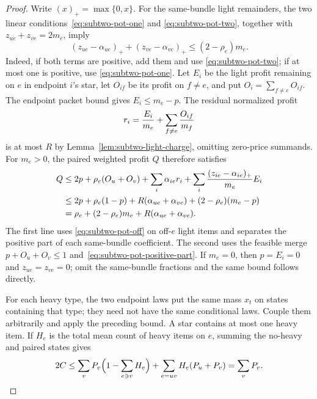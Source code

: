 \documentclass[11pt]{article}
\theoremstyle{definition}\newtheorem{algorithm}{Algorithm}[section]
\numberwithin{equation}{section}
\theoremstyle{remark}\newtheorem*{remark}{Remark}
\begin{document}
\begin{proof}
Write $(x)_+=\max\{0,x\}$. For the same-bundle light remainders, the two linear
conditions~\eqref{eq:subtwo-pot-one} and
\eqref{eq:subtwo-pot-two}, together with
$z_{ue}+z_{ve}=2m_e$, imply
\begin{equation}\label{eq:subtwo-pot-positive-part}
 (z_{ue}-\alpha_{ue})_+
 +(z_{ve}-\alpha_{ve})_+
                  \le(2-\rho_e)m_e.
\end{equation}
Indeed, if both terms are positive, add them and use
\eqref{eq:subtwo-pot-two}; if at most one is positive, use
\eqref{eq:subtwo-pot-one}. Let $E_i$ be the light profit remaining
on $e$ in endpoint $i$'s star, let $O_{if}$ be its profit on
$f\ne e$, and put $O_i=\sum_{f\ne e}O_{if}$. The endpoint packet
bound gives $E_i\le m_e-p$. The residual normalized profit
\[
 r_i={E_i\over m_e}+\sum_{f\ne e}{O_{if}\over m_f}
\]
is at most $R$ by Lemma~\ref{lem:subtwo-light-charge}, omitting
zero-price summands. For $m_e>0$, the paired weighted profit $Q$
therefore satisfies
\begin{align*}
 Q
 &\le 2p+\rho_e(O_u+O_v)+\sum_i\alpha_{ie}r_i
       +\sum_i{(z_{ie}-\alpha_{ie})_+\over m_e}E_i\\
 &\le 2p+\rho_e(1-p)+R(\alpha_{ue}+\alpha_{ve})
       +(2-\rho_e)(m_e-p)\\
 &=\rho_e+(2-\rho_e)m_e+R(\alpha_{ue}+\alpha_{ve}).
\end{align*}
The first line uses \eqref{eq:subtwo-pot-off} on off-$e$ light
items and separates the positive part of each same-bundle
coefficient. The second uses the feasible merge
$p+O_u+O_v\le1$ and~\eqref{eq:subtwo-pot-positive-part}.
If $m_e=0$, then $p=E_i=0$ and $z_{ue}=z_{ve}=0$; omit the
same-bundle fractions and the same bound follows directly.

For each heavy type, the two endpoint laws put the same mass $x_t$
on states containing that type; they need not have the same
conditional laws. Couple them arbitrarily and apply the preceding
bound. A star contains at most one heavy item. If $H_e$ is the total
mean count of heavy items on $e$, summing the no-heavy and paired
states gives
\[
 2C\le\sum_vP_v\Bigl(1-\sum_{e\ni v}H_e\Bigr)
       +\sum_{e=uv}H_e(P_u+P_v)=\sum_vP_v.
\]
\end{proof}
\end{document}
